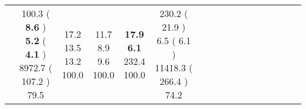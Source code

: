\documentclass[9pt]{article}
\begin{document}
\begin{landscape}
\begin{longtable}{ l | c c c c | c c c c | c c c c | c c c c |}
 &
                    
                            \makecell{              100.3
     (             \textbf{ 8.6 }
    ) \\
            {\footnotesize             \textbf{ 5.2 }
     (              \textbf{ 4.1 }
     )} \\
            {\footnotesize             8972.7
     (            107.2
    ) } \\
            {\small  \textcolor[rgb]{ 0.61 , 0.291 , 0.1} {79.5  }
} }


             &
                            \makecell{              17.2
     \\
            {\footnotesize             13.5
    } \\  {\footnotesize             13.2
     } \\
            {\small \textcolor[rgb]{ 0.2 , 0.7 , 0.1} {100.0  }
} }
             &                         \makecell{              11.7
     \\
            {\footnotesize             8.9
    } \\  {\footnotesize             9.6
     } \\
            {\small \textcolor[rgb]{ 0.2 , 0.7 , 0.1} {100.0  }
} }
             &
                            \makecell{              \textbf{ 17.9 }
     \\
            {\footnotesize             \textbf{ 6.1 }
    } \\  {\footnotesize             232.4
     } \\
            {\small \textcolor[rgb]{ 0.2 , 0.7 , 0.1} {100.0  }
} }
            

 & 
                            \makecell{              230.2
     (             21.9
    ) \\
            {\footnotesize             6.5
     (              6.1
     )} \\
            {\footnotesize             11418.3
     (            266.4
    ) } \\
            {\small  \textcolor[rgb]{ 0.716 , 0.184 , 0.1} {74.2  }
} }



\end{longtable}
\end{landscape}
\end{document}
